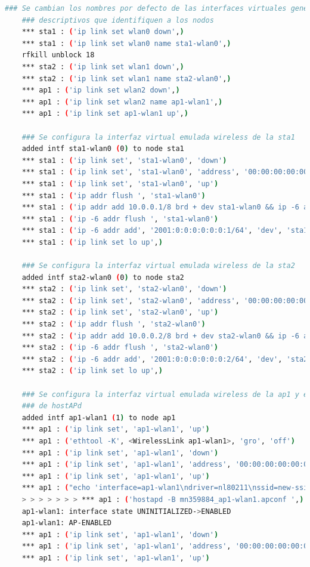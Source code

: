 \begin{lstlisting}[language= bash, style=Consola, caption={Traza de la puesta en marcha del escenario básico},label=code:trazatopobasic]
    ### Se cambian los nombres por defecto de las interfaces virtuales generadas a nombres 
    ### descriptivos que identifiquen a los nodos
    *** sta1 : ('ip link set wlan0 down',)
    *** sta1 : ('ip link set wlan0 name sta1-wlan0',)
    rfkill unblock 18
    *** sta2 : ('ip link set wlan1 down',)
    *** sta2 : ('ip link set wlan1 name sta2-wlan0',)
    *** ap1 : ('ip link set wlan2 down',)
    *** ap1 : ('ip link set wlan2 name ap1-wlan1',)
    *** ap1 : ('ip link set ap1-wlan1 up',)

    ### Se configura la interfaz virtual emulada wireless de la sta1
    added intf sta1-wlan0 (0) to node sta1
    *** sta1 : ('ip link set', 'sta1-wlan0', 'down')
    *** sta1 : ('ip link set', 'sta1-wlan0', 'address', '00:00:00:00:00:02')
    *** sta1 : ('ip link set', 'sta1-wlan0', 'up')
    *** sta1 : ('ip addr flush ', 'sta1-wlan0')
    *** sta1 : ('ip addr add 10.0.0.1/8 brd + dev sta1-wlan0 && ip -6 addr add 2001:0:0:0:0:0:0:1/64 dev sta1-wlan0',)
    *** sta1 : ('ip -6 addr flush ', 'sta1-wlan0')
    *** sta1 : ('ip -6 addr add', '2001:0:0:0:0:0:0:1/64', 'dev', 'sta1-wlan0')
    *** sta1 : ('ip link set lo up',)

    ### Se configura la interfaz virtual emulada wireless de la sta2
    added intf sta2-wlan0 (0) to node sta2
    *** sta2 : ('ip link set', 'sta2-wlan0', 'down')
    *** sta2 : ('ip link set', 'sta2-wlan0', 'address', '00:00:00:00:00:03')
    *** sta2 : ('ip link set', 'sta2-wlan0', 'up')
    *** sta2 : ('ip addr flush ', 'sta2-wlan0')
    *** sta2 : ('ip addr add 10.0.0.2/8 brd + dev sta2-wlan0 && ip -6 addr add 2001:0:0:0:0:0:0:2/64 dev sta2-wlan0',)
    *** sta2 : ('ip -6 addr flush ', 'sta2-wlan0')
    *** sta2 : ('ip -6 addr add', '2001:0:0:0:0:0:0:2/64', 'dev', 'sta2-wlan0')
    *** sta2 : ('ip link set lo up',)

    ### Se configura la interfaz virtual emulada wireless de la ap1 y el proceso
    ### de hostAPd
    added intf ap1-wlan1 (1) to node ap1
    *** ap1 : ('ip link set', 'ap1-wlan1', 'up')
    *** ap1 : ('ethtool -K', <WirelessLink ap1-wlan1>, 'gro', 'off')
    *** ap1 : ('ip link set', 'ap1-wlan1', 'down')
    *** ap1 : ('ip link set', 'ap1-wlan1', 'address', '00:00:00:00:00:01')
    *** ap1 : ('ip link set', 'ap1-wlan1', 'up')
    *** ap1 : ("echo 'interface=ap1-wlan1\ndriver=nl80211\nssid=new-ssid\nwds_sta=1\nhw_mode=g\nchannel=1\nctrl_interface=/var/run/hostapd\nctrl_interface_group=0' > mn359884_ap1-wlan1.apconf",)
    > > > > > > > *** ap1 : ('hostapd -B mn359884_ap1-wlan1.apconf ',)
    ap1-wlan1: interface state UNINITIALIZED->ENABLED
    ap1-wlan1: AP-ENABLED 
    *** ap1 : ('ip link set', 'ap1-wlan1', 'down')
    *** ap1 : ('ip link set', 'ap1-wlan1', 'address', '00:00:00:00:00:01')
    *** ap1 : ('ip link set', 'ap1-wlan1', 'up')


\end{lstlisting}
